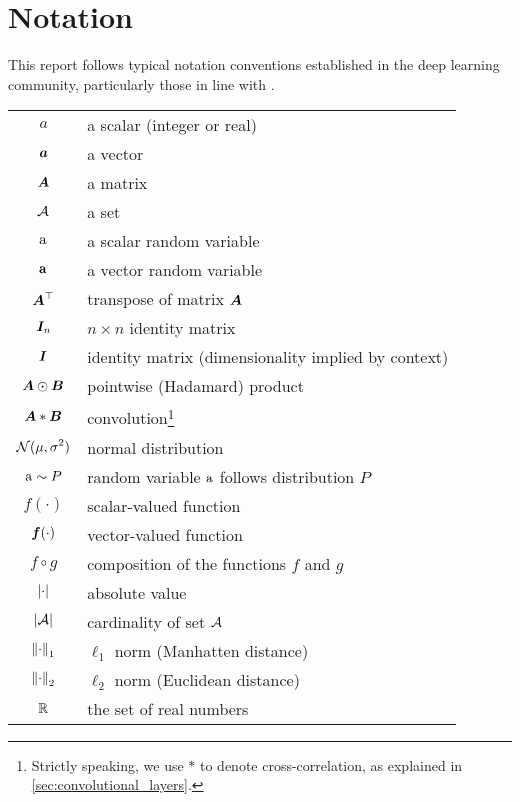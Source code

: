 \documentclass[../report.tex]{subfiles}
\begin{document}
\chapter*{Notation}

This report follows typical notation conventions established in the deep learning community, particularly those in line with \textcite{goodfellow2016}.

\bigskip
\noindent
\begin{tabular}{cl}
    $\displaystyle a$ & a scalar (integer or real)\\
    $\displaystyle {\bm{a}}$ & a vector\\
    $\displaystyle {\bm{A}}$ & a matrix\\
    $\displaystyle {\mathcal{A}}$ & a set\\
    $\displaystyle {\textnormal{a}}$ & a scalar random variable\\
    $\displaystyle {\mathbf{a}}$ & a vector random variable\\
    $\displaystyle {\bm{A}}^\top$ & transpose of matrix ${\bm{A}}$\\
    $\displaystyle {\bm{I}}_n$ & $n \times n$ identity matrix\\
    $\displaystyle {\bm{I}}$ & identity matrix (dimensionality implied by context)\\
    $\displaystyle {\bm{A}} \odot {\bm{B}}$ & pointwise (Hadamard) product\\
    $\displaystyle {\bm{A}} * {\bm{B}}$ & convolution\footnote{Strictly speaking, we use $*$ to denote cross-correlation, as explained in \cref{sec:convolutional_layers}.}\\
    $\displaystyle \mathcal{N}(\mu,\sigma^2)$ & normal distribution\\
    $\displaystyle {\textnormal{a}} \sim P$ & random variable ${\textnormal{a}}$ follows distribution $P$\\
    $\displaystyle f(\cdot)$ & scalar-valued function\\
    $\displaystyle {\bm{f}}(\cdot)$ & vector-valued function\\
    $\displaystyle f \circ g$ & composition of the functions $f$ and $g$\\
    $\displaystyle \lvert\cdot\rvert$ & absolute value\\
    $\displaystyle \lvert{\mathcal{A}}\rvert$ & cardinality of set ${\mathcal{A}}$\\
    $\displaystyle \left\lVert\cdot\right\rVert_1$ & $\ell_1$ norm (Manhatten distance)\\
    $\displaystyle \left\lVert\cdot\right\rVert_2$ & $\ell_2$ norm (Euclidean distance)\\
    $\displaystyle \mathbb{R}$ & the set of real numbers\\

\end{tabular}
\end{document}
